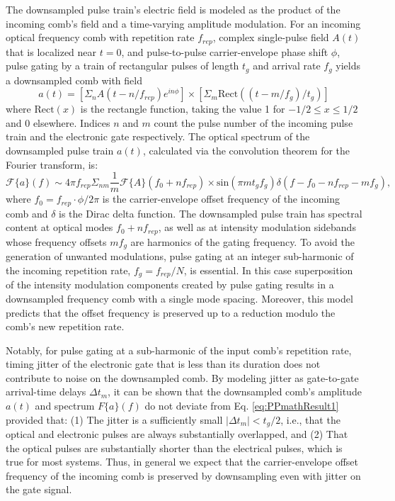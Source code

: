The downsampled pulse train's electric field is modeled as the product of the incoming comb's field and a time-varying amplitude modulation. For an incoming optical frequency comb with repetition rate $f_{rep}$, complex single-pulse field $A(t)$ that is localized near $t=0$, and pulse-to-pulse carrier-envelope phase shift $\phi$, pulse gating by a train of rectangular pulses of length $t_g$ and arrival rate $f_g$  yields a downsampled comb with field
\begin{equation}
a(t)=\left[\Sigma_n A(t-n/f_{rep}) e^{in\phi}\right]\times\left[\Sigma_m \mathrm{Rect}\left((t-m/f_g)/t_g \right)\right]  \label{eq:PPmathResult1}
\end{equation}                                            
where $\mathrm{Rect}(x)$ is the rectangle function, taking the value 1 for $-1/2\leq x\leq 1/2$ and 0 elsewhere. Indices $n$ and $m$ count the pulse number of the incoming pulse train and the electronic gate respectively. The optical spectrum of the downsampled pulse train $a(t)$, calculated via the convolution theorem for the Fourier transform, is:
\begin{equation}
\mathcal{F}\{a\}(f)\sim 4\pi f_{rep} \Sigma_{nm}\frac{1}{m}\mathcal{F}\{A\}(f_0+nf_{rep})\times\mathrm{sin}(\pi m t_g f_g)\delta(f-f_0-nf_{rep}-mf_g ),
\end{equation}
where $f_0=f_{rep}\cdot\phi/2\pi$ is the carrier-envelope offset frequency of the incoming comb and $\delta$ is the Dirac delta function.  The downsampled pulse train has spectral content at optical modes $f_0+nf_{rep}$, as well as at intensity modulation sidebands whose frequency offsets $mf_g$ are harmonics of the gating frequency. To avoid the generation of unwanted modulations, pulse gating at an integer sub-harmonic of the incoming repetition rate, $f_g=f_{rep}/N$, is essential. In this case superposition of the intensity modulation components created by pulse gating results in a downsampled frequency comb with a single mode spacing. Moreover, this model predicts that the offset frequency is preserved up to a reduction modulo the comb's new repetition rate. 

Notably, for pulse gating at a sub-harmonic of the input comb's repetition rate, timing jitter of the electronic gate that is less than its duration does not contribute to noise on the downsampled comb. By modeling jitter as gate-to-gate arrival-time delays $\Delta t_m$, it can be shown that the downsampled comb's amplitude $a(t)$ and spectrum $F\{a\}(f)$ do not deviate from Eq. \ref{eq:PPmathResult1} provided that: (1) The jitter is a sufficiently small $|\Delta t_m |<t_g/2$, i.e., that the optical and electronic pulses are always substantially overlapped, and (2) That the optical pulses are substantially shorter than the electrical pulses, which is true for most systems. Thus, in general we expect that the carrier-envelope offset frequency of the incoming comb is preserved by downsampling even with jitter on the gate signal. 

